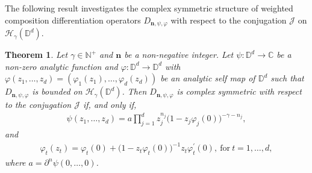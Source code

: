 \documentclass[12pt, reqno]{amsart}
\newtheorem{theorem}{Theorem}[section]
\theoremstyle{definition}
\theoremstyle{remark}
\numberwithin{equation}{section}
\newcommand{\mfn}{\mathbf n}
\begin{document}
The following result investigates the complex symmetric structure of weighted composition differentiation operators $D_{\mfn,\psi,\varphi}$ with respect to the conjugation $\mathcal{J}$ on $\mathcal{H}_\gamma(\mathbb{D}^d)$.
\begin{theorem}\label{Thm_1}
Let $\gamma\in \mathbb{N}^+$ and $\mfn$ be a non-negative integer. Let $\psi: \mathbb{D}^d\longrightarrow \mathbb{C}$ be a non-zero analytic function and $\varphi: \mathbb{D}^d\longrightarrow \mathbb{D}^d$ with $\varphi(z_1,  \dots, z_d)=(\varphi_1(z_1), \dots, \varphi_d(z_d))$ be an analytic self map of $\mathbb{D}^d$ such that $D_{\mfn,\psi,\varphi}$ is bounded on $\mathcal{H}_\gamma(\mathbb{D}^d)$.
    Then $D_{\mfn,\psi,\varphi}$ is complex symmetric with respect to the conjugation $\mathcal{J}$ if, and only if,
\begin{gather*}
    \psi(z_1, \dots, z_d)=a\prod_{j=1}^dz_j^{n_j}\big(1-z_j\varphi_j(0)\big)^{-\gamma-n_j},
\end{gather*}
and 
\begin{gather*}
        \varphi_t(z_t)=\varphi_t(0)+\big(1-z_t\varphi_t(0)\big)^{-1}z_t\varphi_t^{\prime}(0),~ \mbox{for}~ t=1, \dots, d,
\end{gather*}
where $a=\partial^n\psi(0, \dots, 0)$.
\end{theorem}
\end{document}
